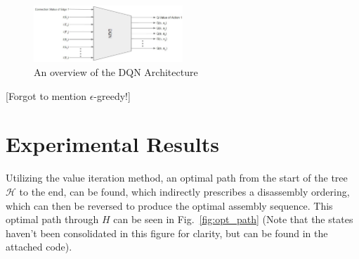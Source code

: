 \documentclass{article}
\begin{document}
\begin{figure}[!htb]
\centering
\includegraphics[width=0.5\textwidth]{figs/DQN Architecture.jpg}
  \caption{An overview of the DQN Architecture}\label{fig: DQN}
\end{figure}

{\color{red}[Forgot to mention $\epsilon$-greedy!]}


\section{Experimental Results}

Utilizing the value iteration method, an optimal path from the start of the tree $\mathcal{H}$ to the end, can be found, which indirectly prescribes a disassembly ordering, which can then be reversed to produce the optimal assembly sequence. This optimal path through $H$ can be seen in Fig.~\ref{fig:opt_path} (Note that the states haven't been consolidated in this figure for clarity, but can be found in the attached code).
\end{document}
